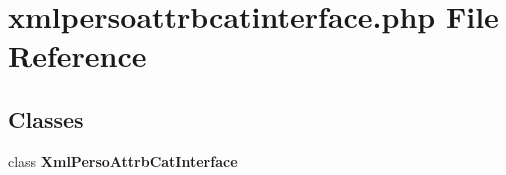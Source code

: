 \section{xmlpersoattrbcatinterface.php File Reference}
\label{xmlpersoattrbcatinterface_8php}


\subsection*{Classes}
\begin{CompactItemize}
\item 
class {\bf Xml\-Perso\-Attrb\-Cat\-Interface}
\end{CompactItemize}
